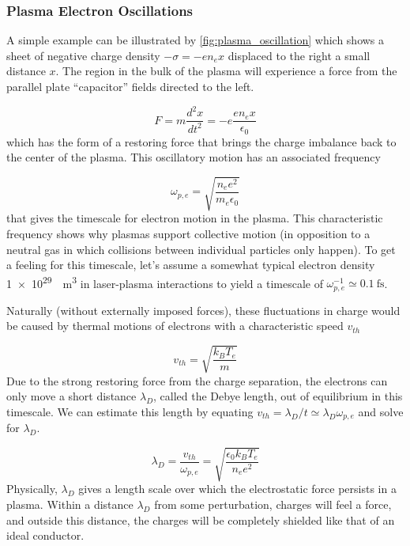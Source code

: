 \subsubsection{Plasma Electron Oscillations}
A simple example can be illustrated by \cref{fig:plasma_oscillation} which shows a sheet of negative charge density $-\sigma = -e n_e x$ displaced to the right a small distance $x$. The region in the bulk of the plasma will experience a force from the parallel plate ``capacitor'' fields directed to the left.

\begin{equation}
	F = m \frac{d^2 x}{d t^2} = - e \frac{e n_e x}{\epsilon_0}
\end{equation}
which has the form of a restoring force that brings the charge imbalance back to the center of the plasma. This oscillatory motion has an associated frequency 

\begin{equation}
	\omega_{p,e} = \sqrt{\frac{n_e e^2}{m_e \epsilon_0}} \label{eq:omegape}
\end{equation}
that gives the timescale for electron motion in the plasma. This characteristic frequency shows why plasmas support collective motion (in opposition to a neutral gas in which collisions between individual particles only happen). To get a feeling for this timescale, let's assume a somewhat typical electron density \SI{1e29}{\per \meter \cubed} in laser-plasma interactions to yield a timescale of $\omega_{p,e}^{-1} \simeq \SI{0.1}{\femto \second}$.

Naturally (without externally imposed forces), these fluctuations in charge would be caused by thermal motions of electrons with a characteristic speed $v_{th}$ 

\begin{equation}
	v_{th} = \sqrt{\frac{k_B T_e}{m}} \label{eq:vthermal}
\end{equation}
Due to the strong restoring force from the charge separation, the electrons can only move a short distance $\lambda_D$, called the Debye length, out of equilibrium in this timescale. We can estimate this length by equating $v_{th} = \lambda_D / t \simeq \lambda_D \omega_{p,e}$ and solve for $\lambda_D$.

\begin{equation}
	\lambda_D = \frac{v_{th}}{\omega_{p,e}} = \sqrt{\frac{\epsilon_0 k_B T_e}{n_e e^2}} \label{eq:debye}
\end{equation} 
Physically, $\lambda_D$ gives a length scale over which the electrostatic force persists in a plasma. Within a distance $\lambda_D$ from some perturbation, charges will feel a force, and outside this distance, the charges will be completely shielded like that of an ideal conductor. 

